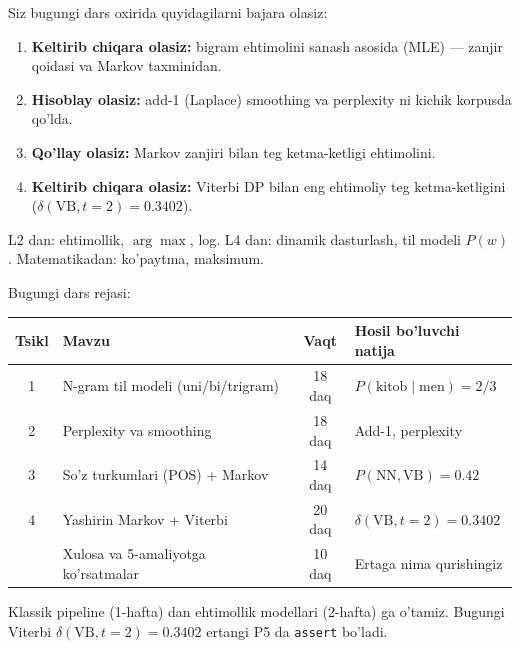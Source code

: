 \documentclass[aspectratio=169,11pt]{beamer}
\begin{document}
\begin{frame}{Siz bugungi dars oxirida quyidagilarni bajara olasiz:}
  \begin{enumerate}\setlength\itemsep{6pt}
    \item \textbf{Keltirib chiqara olasiz:} bigram ehtimolini sanash asosida
          (MLE) --- zanjir qoidasi va Markov taxminidan.
    \item \textbf{Hisoblay olasiz:} add-1 (Laplace) smoothing va perplexity ni
          kichik korpusda qo'lda.
    \item \textbf{Qo'llay olasiz:} Markov zanjiri bilan teg ketma-ketligi
          ehtimolini.
    \item \textbf{Keltirib chiqara olasiz:} Viterbi DP bilan eng ehtimoliy teg
          ketma-ketligini ($\delta(\text{VB},t{=}2)=0.3402$).
  \end{enumerate}
  \vspace{4pt}
  \begin{tcolorbox}[defbox,title=Oldindan talab]
    \footnotesize
    L2 dan: ehtimollik, $\arg\max$, log. L4 dan: dinamik dasturlash, til modeli
    $P(w)$. Matematikadan: ko'paytma, maksimum.
  \end{tcolorbox}
\end{frame}

\begin{frame}{Bugungi dars rejasi:}
  \begin{center}
  \small
  \begin{tabular}{c p{5.2cm} c p{3.0cm}}
    \toprule
    \textbf{Tsikl}& \textbf{Mavzu} & \textbf{Vaqt} & \textbf{Hosil bo'luvchi natija}\\
    \midrule
    1 & N-gram til modeli (uni/bi/trigram) & 18 daq & $P(\text{kitob}{\mid}\text{men})=2/3$ \\
    2 & Perplexity va smoothing & 18 daq & Add-1, perplexity \\
    3 & So'z turkumlari (POS) + Markov & 14 daq & $P(\text{NN},\text{VB})=0.42$ \\
    4 & Yashirin Markov + Viterbi & 20 daq & $\delta(\text{VB},t{=}2)=0.3402$ \\
    \midrule
      & Xulosa va 5-amaliyotga ko'rsatmalar & 10 daq & Ertaga nima qurishingiz \\
    \bottomrule
  \end{tabular}
  \end{center}
  \vspace{4pt}
  \begin{tcolorbox}[warnbox,title=Bu dars 2-haftani ochadi]
    \footnotesize\sloppy
    Klassik pipeline (1-hafta) dan ehtimollik modellari (2-hafta) ga o'tamiz.
    Bugungi Viterbi $\delta(\text{VB},t{=}2)=0.3402$ ertangi P5 da \texttt{assert} bo'ladi.
  \end{tcolorbox}
\end{frame}
\end{document}
